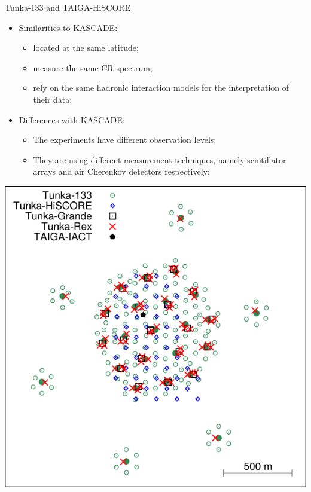 
%

\begin{frame}{Tunka-133 and TAIGA-HiSCORE}
\begin{minipage}[c]{0.6\textwidth}
\begin{itemize}
  \item Similarities to KASCADE:
  \begin{itemize}
    \item located at the same latitude;
    \item measure the same CR spectrum;
    \item rely on the same hadronic interaction models for the interpretation of their data;
  \end{itemize}
  \item Differences with KASCADE:
  \begin{itemize}
    \item The experiments have different observation levels;
    \item They are using different measurement techniques, namely scintillator arrays and air Cherenkov detectors respectively;
  \end{itemize}
\end{itemize}
\end{minipage}
\hfill
\begin{minipage}[c]{0.39\textwidth}
\includegraphics[width=1\textwidth]{pics/taiga_map.png}
\end{minipage}


\end{frame}
